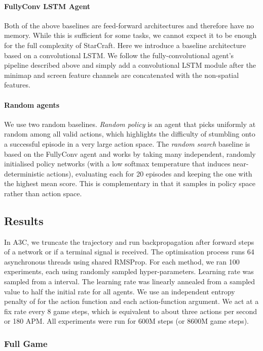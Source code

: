 \documentclass{article}
\begin{document}
\paragraph{FullyConv LSTM Agent} 
Both of the above baselines are feed-forward architectures and therefore have no memory. While this is sufficient for some tasks, we cannot expect it to be enough for the full complexity of StarCraft. 
Here we introduce a baseline architecture based on a convolutional LSTM. 
We follow the fully-convolutional agent's pipeline described above and simply add a convolutional LSTM module after the minimap and screen feature channels are concatenated with the non-spatial features.

\paragraph{Random agents}
We use two random baselines. 
\emph{Random policy} is an agent that picks uniformly at random among all valid actions, which highlights the difficulty of stumbling onto a successful episode in a very large action space. 
The \emph{random search} baseline is based on the FullyConv agent and works by taking many independent, randomly initialised policy networks (with a low softmax temperature that induces near-deterministic actions), evaluating each for 20 episodes and keeping the one with the highest mean score. 
This is complementary in that it samples in policy space rather than action space.

\subsection{Results}

In A3C, we truncate the trajectory and run backpropagation after  forward steps of a network or if a terminal signal is received. 
The optimisation process runs 64 asynchronous threads using shared RMSProp. For each method, we ran 100 experiments, each using randomly sampled hyper-parameters. Learning rate was sampled from a  interval. The learning rate was linearly annealed from a sampled value to half the initial rate for all agents. We use an independent entropy penalty of  for the action function and each action-function argument. We act at a fix rate every 8 game steps, which is equivalent to about three actions per second or 180 APM. 
All experiments were run for 600M steps (or 8600M game steps). 

\subsubsection{Full Game}
\end{document}
